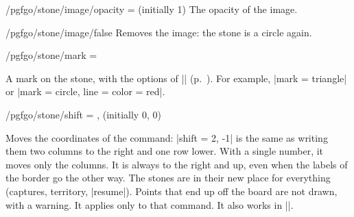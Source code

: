 \begin{key}{/pgfgo/stone/image/opacity =  (initially 1)}
	The opacity of the image.

	\begin{codeexample}[]
		\begin{goban}[5, partial = B2:D4]
		\end{goban}
	\end{codeexample}
\end{key}

\begin{stylekey}{/pgfgo/stone/image/false}
	Removes the image: the stone is a circle again.
\end{stylekey}

\begin{key}{/pgfgo/stone/mark = }

	A mark on the stone, with the options of |\mark| (p.~\pageref{sec:marcas}). For example, |mark = triangle| or |mark = {circle, line = {color = red}}|.

	\begin{codeexample}[]

		\begin{goban}
		\end{goban}

		\begin{goban}
			\stones[b, mark = triangle]{C2,D3}
			\stone[w, mark = t-circle]{B4}
		\end{goban}
	\end{codeexample}
\end{key}

\begin{key}{/pgfgo/stone/shift = ,  (initially 0, 0)}

	Moves the coordinates of the command: |shift = {2, -1}| is the same as writing them two columns to the right and one row lower. With a single number, it moves only the columns. It is always to the right and up, even when the labels of the border go the other way. The stones are in their new place for everything (captures, territory, |resume|). Points that end up off the board are not drawn, with a warning. It applies only to that command. It also works in |\stone|.

	\begin{codeexample}[]
		\def\corner{A1--A3, B5; A2}
		\begin{goban}[9]
			\stones[b]{\corner}
			\stones[w, shift = {4, 2}]{\corner}
		\end{goban}
	\end{codeexample}
\end{key}

